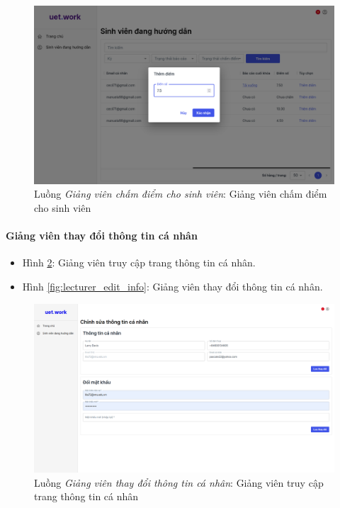 \documentclass[./../main.tex]{subfiles}
\begin{document}
\begin{figure}[]
	\includegraphics[width=\linewidth]{./images/image65.png}
	\caption{Luồng \emph{Giảng viên chấm điểm cho sinh viên}: Giảng viên chấm điểm cho sinh viên}
	\label{fig:lecturer_score}
\end{figure}

\paragraph*{Giảng viên thay đổi thông tin cá nhân}

\begin{itemize}
	\item Hình \ref{fig:lecturer_access_info_page}: Giảng viên truy cập trang thông tin cá nhân.
	\item Hình \ref{fig:lecturer_edit_info}: Giảng viên thay đổi thông tin cá nhân.
\end{itemize}

\begin{figure}[]
	\includegraphics[width=\linewidth]{./images/image51.png}
	\caption{Luồng \emph{Giảng viên thay đổi thông tin cá nhân}: Giảng viên truy cập trang thông tin cá nhân}
	\label{fig:lecturer_access_info_page}
\end{figure}
\end{document}
